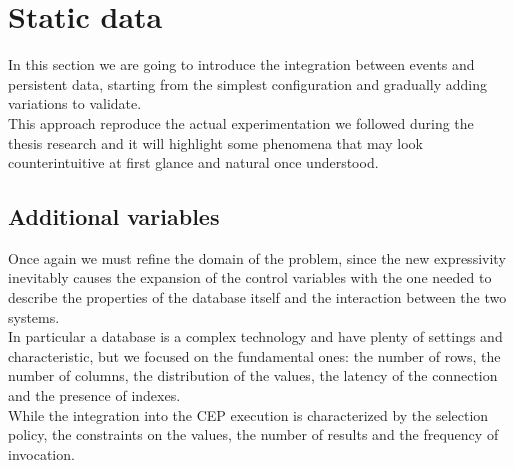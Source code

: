 \section{Static data}
In this section we are going to introduce the integration between events and persistent data, starting from the simplest configuration and gradually adding variations to validate.\\
This approach reproduce the actual experimentation we followed during the thesis research and it will highlight some phenomena that may look counterintuitive at first glance and natural once understood.

\subsection{Additional variables}
Once again we must refine the domain of the problem, since the new expressivity inevitably causes the expansion of the control variables with the one needed to describe the properties of the database itself and the interaction between the two systems.\\
In particular a database is a complex technology and have plenty of settings and characteristic, but we focused on the fundamental ones: the number of rows, the number of columns, the distribution of the values, the latency of the connection and the presence of indexes.\\
While the integration into the CEP execution is characterized by the selection policy, the constraints on the values, the number of results and the frequency of invocation.

